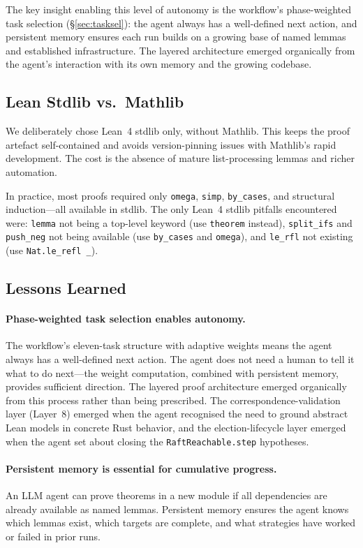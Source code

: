 \documentclass[sigconf,10pt]{acmart}
\begin{document}
The key insight enabling this level of autonomy is the workflow's
phase-weighted task selection (\S\ref{sec:tasksel}): the agent always
has a well-defined next action, and persistent memory ensures each run
builds on a growing base of named lemmas and established
infrastructure.  The layered architecture emerged organically from the
agent's interaction with its own memory and the growing codebase.

\subsection{Lean Stdlib vs.\ Mathlib}

We deliberately chose Lean~4 stdlib only, without Mathlib.  This keeps
the proof artefact self-contained and avoids version-pinning issues
with Mathlib's rapid development.  The cost is the absence of mature
list-processing lemmas and richer automation.

In practice, most proofs required only \texttt{omega}, \texttt{simp},
\texttt{by\_cases}, and structural induction---all available in stdlib.
The only Lean~4 stdlib pitfalls encountered were: \texttt{lemma} not
being a top-level keyword (use \texttt{theorem} instead),
\texttt{split\_ifs} and \texttt{push\_neg} not being available
(use \texttt{by\_cases} and \texttt{omega}), and \texttt{le\_rfl}
not existing (use \texttt{Nat.le\_refl \_}).

\subsection{Lessons Learned}

\paragraph{Phase-weighted task selection enables autonomy.}
The workflow's eleven-task structure with adaptive weights means the
agent always has a well-defined next action.  The agent does not need
a human to tell it what to do next---the weight computation, combined
with persistent memory, provides sufficient direction.  The layered
proof architecture emerged organically from this process rather than
being prescribed.  The correspondence-validation layer (Layer~8) emerged
when the agent recognised the need to ground abstract Lean models in
concrete Rust behavior, and the election-lifecycle layer emerged
when the agent set about closing the \texttt{RaftReachable.step}
hypotheses.

\paragraph{Persistent memory is essential for cumulative progress.}
An LLM agent can prove theorems in a new module if all dependencies
are already available as named lemmas.  Persistent memory ensures
the agent knows which lemmas exist, which targets are complete, and
what strategies have worked or failed in prior runs.
\end{document}
